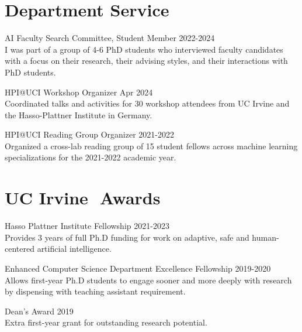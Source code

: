\documentclass[margin]{res}
\begin{document}
\begin{resume}
\section{Department Service}



AI Faculty Search Committee, Student Member \hfill 2022-2024\\
I was part of a group of 4-6 PhD students who interviewed faculty candidates with a focus on their research, their advising styles, and their interactions with PhD students. 

HPI@UCI Workshop Organizer \hfill Apr 2024\\
Coordinated talks and activities for 30 workshop attendees from UC Irvine and the Hasso-Plattner Institute in Germany.

HPI@UCI Reading Group Organizer \hfill 2021-2022\\
Organized a cross-lab reading group of 15 student fellows across machine learning specializations for the 2021-2022 academic year.

\section{UC Irvine\,\, Awards}

Hasso Plattner Institute Fellowship \hfill 2021-2023\\
Provides 3 years of full Ph.D funding for work on adaptive, safe and human-centered artificial intelligence.

Enhanced Computer Science Department Excellence Fellowship \hfill 2019-2020\\
Allows first-year Ph.D students to engage sooner and more deeply with research by dispensing with teaching assistant requirement.

Dean's Award \hfill 2019\\
Extra first-year grant for outstanding research potential.



\end{resume}
\end{document}
